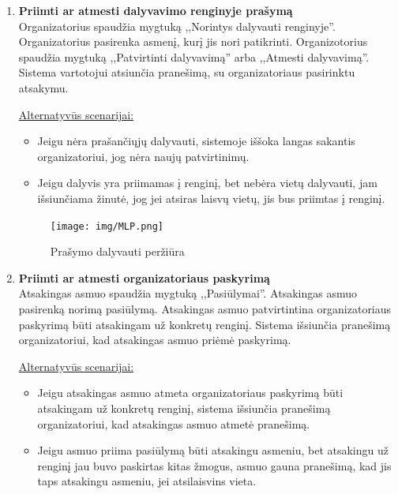 \documentclass{VUMIFPSkursinis}
\begin{document}
\begin{enumerate} [label = \textbf{U\arabic*.}]
				\begin{figure}[H]
					\centering
					\texttt{[image: img/MLP.png]}
					\caption{Renginio ištrynimas}
					\label{fig:istrinti-rengini}
				\end{figure}
				
			\item \textbf{Priimti ar atmesti dalyvavimo renginyje prašymą} \\
				Organizatorius spaudžia mygtuką ,,Norintys dalyvauti renginyje''.
				Organizatorius pasirenka asmenį, kurį jis nori patikrinti. 
				Organizotorius spaudžia mygtuką ,,Patvirtinti dalyvavimą'' arba ,,Atmesti dalyvavimą''. 
				Sistema vartotojui atsiunčia pranešimą, su organizatoriaus pasirinktu atsakymu.
				
				\underline{Alternatyvūs scenarijai:}
				\begin{itemize}
					\item Jeigu nėra prašančiųjų dalyvauti, sistemoje iššoka langas sakantis organizatoriui, jog nėra naujų patvirtinimų.
					\item Jeigu dalyvis yra priimamas į renginį, bet nebėra vietų dalyvauti, jam išsiunčiama žinutė, jog jei atsiras laisvų vietų, jis bus priimtas į renginį.
				\end{itemize}
				
				\begin{figure}[H]
					\centering
					\texttt{[image: img/MLP.png]}
					\caption{Prašymo dalyvauti peržiūra}
					\label{fig:priimti-dalyvi}
				\end{figure}
				
			\item \textbf{Priimti ar atmesti organizatoriaus paskyrimą} \\
				Atsakingas asmuo spaudžia mygtuką ,,Pasiūlymai''. 
				Atsakingas asmuo pasirenką norimą pasiūlymą.
				Atsakingas asmuo patvirtintina organizatoriaus paskyrimą būti atsakingam už konkretų renginį. 
				Sistema išsiunčia pranešimą organizatoriui, kad atsakingas asmuo priėmė paskyrimą.
				
				\underline{Alternatyvūs scenarijai:}
				\begin{itemize}
					\item Jeigu atsakingas asmuo atmeta organizatoriaus paskyrimą būti atsakingam už konkretų renginį, sistema išsiunčia pranešimą organizatoriui, kad atsakingas asmuo atmetė pranešimą.
					\item Jeigu asmuo priima pasiūlymą būti atsakingu asmeniu, bet atsakingu už renginį jau buvo paskirtas kitas žmogus, asmuo gauna pranešimą, kad jis taps atsakingu asmeniu, jei atsilaisvins vieta.
				\end{itemize}
				

\end{enumerate}
\end{document}
